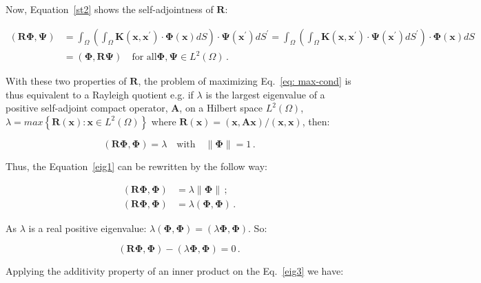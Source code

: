 \documentclass[10pt,fleqn,a4paper]{article}
\newcommand{\bv}[1]{\mathbf{#1}}
\newcommand{\xp}{x^{\mathbf{\prime}}}
\begin{document}
Now, Equation~\eqref{st2} shows the self-adjointness of $\bv{R}$:


\begin{equation}\label{st2}
 \begin{split}
 (\bv{R}\bv{\Phi},\bv{\Psi}) &= \int_{\Omega} \left (\int_{\Omega} \bv{K}(\bv{x},\bv{\xp}) \cdot \bv{\Phi}(\bv{x}) dS \right) \cdot \bv{\Psi}(\bv{\xp}) dS^{\prime} = 
\int_{\Omega} \left( \int_{\Omega} \bv{K}(\bv{x},\bv{\xp}) \cdot \bv{\Psi}(\bv{\xp}) dS^{\prime} \right) \cdot \bv{\Phi}(\bv{x}) dS \\
 &= (\bv{\Phi},\bv{R}\bv{\Psi}) \quad \text{for all} \bv{\Phi}, \bv{\Psi} \in L^{2}(\Omega) \,.
\end{split}
\end{equation}

With these two properties of $\bv{R}$, the problem of maximizing Eq.~\eqref{eq: max-cond} is thus equivalent to a Rayleigh quotient e.g. if $\lambda$ is the largest eigenvalue of a positive self-adjoint compact operator, $\bv{A}$, on a Hilbert space $L^2 (\Omega)$, $\lambda = max \left\lbrace \bv{R(x)} : \bv{x} \in L^2 (\Omega) \right\rbrace$ where $\bv{R(x)=(x,Ax)/(x,x)}$, then:


\begin{equation}\label{eig1}
 \left(\bv{R} \bv{\Phi} , \bv{\Phi} \right) = \lambda \quad \text{with} \quad \parallel \bv{\Phi} \parallel = 1 \,.
\end{equation}


Thus, the Equation~\eqref{eig1} can be rewritten by the follow way:


\begin{equation}\label{eig2}
 \begin{split}
 \left(\bv{R} \bv{\Phi} , \bv{\Phi} \right) &= \lambda \parallel \bv{\Phi} \parallel \,; \\
 \left(\bv{R} \bv{\Phi} , \bv{\Phi} \right) &= \lambda \left(\bv{\Phi}, \bv{\Phi} \right) \, .
 \end{split}
\end{equation}


As $\lambda$ is a real positive eigenvalue: $\lambda \left(\bv{\Phi}, \bv{\Phi} \right) = \left(\lambda \bv{\Phi}, \bv{\Phi} \right)$. So:


\begin{equation}\label{eig3}
 \left(\bv{R} \bv{\Phi} , \bv{\Phi} \right) - \left(\lambda \bv{\Phi}, \bv{\Phi} \right) = 0 \,.
\end{equation}


Applying the additivity property of an inner product on the Eq.~\eqref{eig3} we have:
\end{document}
